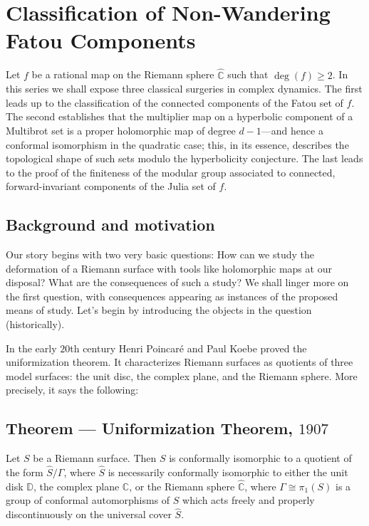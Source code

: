\documentclass[11pt,a4paper]{article}
\begin{document}
\section*{Classification of Non-Wandering Fatou Components}


        Let $f$ be a rational map on the Riemann sphere $\hat{\mathbb C}$ such that $\deg(f)\geq2$. In this series we shall expose three classical surgeries in complex dynamics. The first leads up to the classification of the connected components of the Fatou set of $f$. The second establishes that the multiplier map on a hyperbolic component of a Multibrot set is a proper holomorphic map of degree $d-1$---and hence a conformal isomorphism in the quadratic case; this, in its essence, describes the topological shape of such sets modulo the hyperbolicity conjecture. The last leads to the proof of the finiteness of the modular group associated to connected, forward-invariant components of the Julia set of $f$.

\subsection{Background and motivation}


        Our story begins with two very basic questions: How can we study the deformation of a Riemann surface with tools like holomorphic maps at our disposal? What are the consequences of such a study? We shall linger more on the first question, with consequences appearing as instances of the proposed means of study. Let's begin by introducing the objects in the question (historically).

        In the early $20$th century Henri Poincaré and Paul Koebe proved the uniformization theorem. It characterizes Riemann surfaces as quotients of three model surfaces: the unit disc, the complex plane, and the Riemann sphere. More precisely, it says the following:


        \subsection*{Theorem — Uniformization Theorem, $1907$} Let $S$ be a Riemann surface. Then $S$ is conformally isomorphic to a quotient of the form $\hat{S}/\Gamma$, where $\hat{S}$ is necessarily conformally isomorphic to either the unit disk $\mathbb{D}$, the complex plane $\mathbb{C}$, or the Riemann sphere $\hat{\mathbb{C}}$, where $\Gamma \cong \pi_1(S)$ is a group of conformal automorphisms of $S$ which acts freely and properly discontinuously on the universal cover $\hat{S}$.
\end{document}
